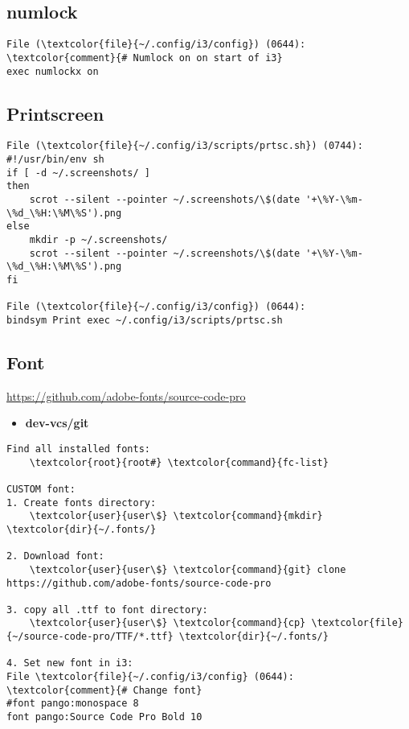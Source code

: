 \documentclass[10pt, a4paper, onecolumn, openany]{book}         %
\begin{document}
\subsection{numlock}
\begin{Verbatim}[commandchars=\\\{\}]
File (\textcolor{file}{~/.config/i3/config}) (0644):
\textcolor{comment}{# Numlock on on start of i3}
exec numlockx on
\end{Verbatim}





\subsection{Printscreen}
\begin{Verbatim}[commandchars=\\\{\}]
File (\textcolor{file}{~/.config/i3/scripts/prtsc.sh}) (0744):
#!/usr/bin/env sh
if [ -d ~/.screenshots/ ]
then
    scrot --silent --pointer ~/.screenshots/\$(date '+\%Y-\%m-\%d_\%H:\%M\%S').png
else
    mkdir -p ~/.screenshots/
    scrot --silent --pointer ~/.screenshots/\$(date '+\%Y-\%m-\%d_\%H:\%M\%S').png
fi

File (\textcolor{file}{~/.config/i3/config}) (0644):
bindsym Print exec ~/.config/i3/scripts/prtsc.sh
\end{Verbatim}



\subsection{Font}
\underline{\url{https://github.com/adobe-fonts/source-code-pro}}

\begin{itemize}
    \item \textbf{dev-vcs/git}
\end{itemize}


\begin{Verbatim}[commandchars=\\\{\}]
Find all installed fonts:
    \textcolor{root}{root#} \textcolor{command}{fc-list}

CUSTOM font:
1. Create fonts directory:
    \textcolor{user}{user\$} \textcolor{command}{mkdir} \textcolor{dir}{~/.fonts/}
 
2. Download font:
    \textcolor{user}{user\$} \textcolor{command}{git} clone https://github.com/adobe-fonts/source-code-pro
    
3. copy all .ttf to font directory:
    \textcolor{user}{user\$} \textcolor{command}{cp} \textcolor{file}{~/source-code-pro/TTF/*.ttf} \textcolor{dir}{~/.fonts/}

4. Set new font in i3:
File \textcolor{file}{~/.config/i3/config} (0644):
\textcolor{comment}{# Change font}
#font pango:monospace 8
font pango:Source Code Pro Bold 10
\end{Verbatim}
\end{document}
